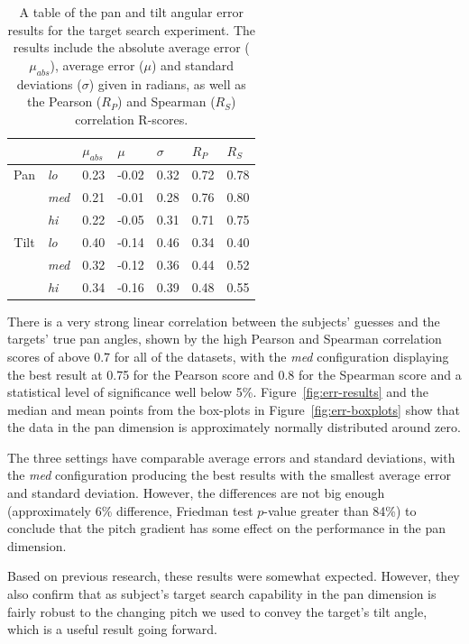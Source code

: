\documentclass[format=sigconf, review=true, screen=true, anonymous=true]{acmart}
\begin{document}
\begin{table}
  \centering
  \caption{A table of the pan and tilt angular error results for the target search experiment. The results include the absolute average error ($\mu_{abs}$), average error ($\mu$) and standard deviations ($\sigma$) given in radians, as well as the Pearson ($R_P$) and Spearman ($R_S$) correlation R-scores.}
  \label{tab:results}
  \begin{tabular}{|c|l|l|l|l|l|l|}
    \hline
    & & $\mu_{abs}$ & $\mu$ & $\sigma$ & $R_{P}$ & $R_{S}$ \\\hline\hline
    Pan & \emph{lo}  & 0.23 & -0.02 & 0.32 & 0.72 & 0.78 \\\cline{2-7}
    & \emph{med} & 0.21 & -0.01 & 0.28 & 0.76 & 0.80 \\\cline{2-7}
    & \emph{hi}  & 0.22 & -0.05 & 0.31 & 0.71 & 0.75 \\\hline\hline
    Tilt & \emph{lo}  & 0.40 & -0.14 & 0.46 & 0.34 & 0.40 \\\cline{2-7}
    & \emph{med} & 0.32 & -0.12 & 0.36 & 0.44 & 0.52 \\\cline{2-7}
    & \emph{hi}  & 0.34 & -0.16 & 0.39 & 0.48 & 0.55 \\\hline
  \end{tabular}
\end{table}

There is a very strong linear correlation between the subjects' guesses and the targets' true pan angles, shown by the high Pearson and Spearman correlation scores of above 0.7 for all of the datasets, with the \emph{med} configuration displaying the best result at 0.75 for the Pearson score and 0.8 for the Spearman score and a statistical level of significance well below 5\%. Figure~\ref{fig:err-results} and the median and mean points from the box-plots in Figure~\ref{fig:err-boxplots} show that the data in the pan dimension is approximately normally distributed around zero.  

The three settings have comparable average errors and standard deviations, with the \emph{med} configuration producing the best results with the smallest average error and standard deviation. However, the differences are not big enough (approximately 6\% difference, Friedman test $p$-value greater than 84\%) to conclude that the pitch gradient has some effect on the performance in the pan dimension. 

Based on previous research, these results were somewhat expected. However, they also confirm that as subject's target search capability in the pan dimension is fairly robust to the changing pitch we used to convey the target's tilt angle, which is a useful result going forward. %
\end{document}
